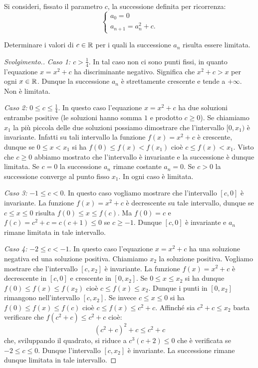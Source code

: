 \begin{exercise}
\label{ex:mandelbrot_reale}
Si consideri, fissato il parametro $c$, la successione definita per ricorrenza:
\[
  \begin{cases}
    a_0 = 0\\
    a_{n+1} = a_n^2 + c.
  \end{cases}
\]

Determinare i valori di $c\in {\mathbb R}$ per i quali la successione $a_n$ risulta
essere limitata.
\end{exercise}
%
\begin{proof}[Svolgimento.]
\emph{Caso 1: $c > \frac 1 4$}.
In tal caso non ci sono punti fissi, in quanto l'equazione $x=x^2+c$ ha
discriminante negativo. Significa che $x^2+c > x$ per ogni $x\in {\mathbb R}$. Dunque
la successione $a_n$ è strettamente crescente e tende a $+\infty$.
Non è limitata.

\emph{Caso 2:} $0\le c \le \frac 1 4$.
In questo caso l'equazione $x=x^2+c$ ha due soluzioni entrambe positive
(le soluzioni hanno somma $1$ e prodotto $c\ge 0$).
Se chiamiamo $x_1$ la più piccola delle due soluzioni possiamo dimostrare che
l'intervallo $[0,x_1)$ è invariante. Infatti su tali intervallo la funzione
$f(x)=x^2+c$ è crescente, dunque se $0\le x < x_1$ si ha $f(0) \le f(x) < f(x_1)$
cioè $c \le f(x) < x_1$. Visto che $c\ge 0$ abbiamo mostrato che l'intervallo è
invariante e la successione è dunque limitata.
Se $c=0$ la successione $a_n$ rimane costante $a_n=0$. Se $c>0$ la successione
converge al punto fisso $x_1$. In ogni caso è limitata.

\emph{Caso 3:} $-1 \le c < 0$.
In questo caso vogliamo mostrare che l'intervallo $[c,0]$ è invariante.
La funzione $f(x) = x^2+c$ è decrescente su tale intervallo, dunque
se $c\le x \le 0$ risulta $f(0)\le x \le f(c)$. Ma $f(0)=c$ e $f(c)=c^2+c
= c(c+1) \le 0$ se $c\ge -1$. Dunque $[c,0]$ è invariante e $a_n$ rimane
limitata in tale intervallo.

\emph{Caso 4:} $-2\le c < -1$.
In questo caso l'equazione $x=x^2+c$ ha una soluzione negativa ed una soluzione
positiva. Chiamiamo $x_2$ la soluzione positiva. Vogliamo mostrare che
l'intervallo $[c,x_2]$ è invariante.
La funzione $f(x)=x^2+c$ è decrescente in $[c,0]$ e crescente in $[0,x_2]$.
Se $0\le x \le x_2$ si ha dunque $f(0)\le f(x) \le f(x_2)$
cioè $c \le f(x) \le x_2$. Dunque i punti in $[0,x_2]$ rimangono nell'intervallo
$[c,x_2]$.
Se invece $c\le x \le 0$ si ha $f(0)\le f(x) \le f(c)$ cioè $c \le f(x) \le c^2+c$.
Affinché sia $c^2+c\le x_2$ basta verificare che $f(c^2+c)\le c^2+c$
cioè:
\[
  (c^2+c)^2 + c \le c^2+c
\]
che, sviluppando il quadrato, si riduce a $c^3(c+2)\le 0$ che è verificata
se $-2 \le c \le 0$.
Dunque l'intervallo $[c,x_2]$ è invariante. La successione rimane dunque
limitata in tale intervallo.


\end{proof}
